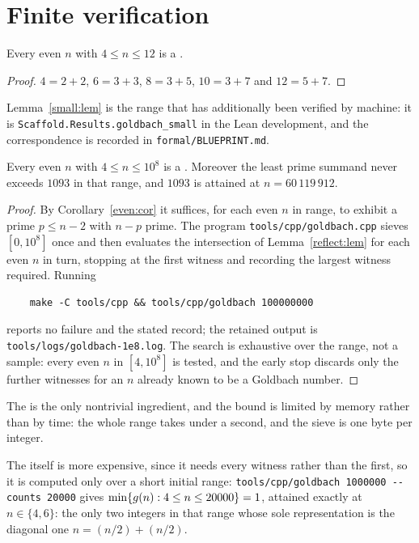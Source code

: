 \section{Finite verification}\label{sec:verify}

\begin{lemma}\label{small:lem}
Every even $n$ with $4\leq n\leq12$ is a .
\end{lemma}

\begin{proof}
$4=2+2$, $6=3+3$, $8=3+5$, $10=3+7$ and $12=5+7$.
\end{proof}

Lemma~\ref{small:lem} is the range that has additionally been verified by
machine: it is \texttt{Scaffold.Results.goldbach\_small} in the Lean
development, and the correspondence is recorded in
\texttt{formal/BLUEPRINT.md}.

\begin{theorem}\label{verify:thm}
Every even $n$ with $4\leq n\leq10^{8}$ is a .  Moreover
the least prime summand never exceeds $1093$ in that range, and $1093$ is
attained at $n=60\,119\,912$.
\end{theorem}

\begin{proof}
By Corollary~\ref{even:cor} it suffices, for each even $n$ in range, to exhibit
a prime $p\leq n-2$ with $n-p$ prime.  The program
\texttt{tools/cpp/goldbach.cpp} sieves $[0,10^{8}]$ once and then evaluates the
intersection of Lemma~\ref{reflect:lem} for each even $n$ in turn, stopping at
the first witness and recording the largest witness required.  Running
\begin{verbatim}
    make -C tools/cpp && tools/cpp/goldbach 100000000
\end{verbatim}
reports no failure and the stated record; the retained output is
\texttt{tools/logs/goldbach-1e8.log}.  The search is exhaustive over the range,
not a sample: every even $n$ in $[4,10^{8}]$ is tested, and the early stop
discards only the further witnesses for an $n$ already known to be a Goldbach
number.
\end{proof}

The  is the only nontrivial ingredient,
and the bound is limited by memory rather than by time: the whole range takes
under a second, and the sieve is one byte per integer.

The  itself is more expensive, since it needs every
witness rather than the first, so it is computed only over a short initial
range: \texttt{tools/cpp/goldbach 1000000 -{}-counts 20000} gives
$\min\{g(n):4\leq n\leq20000\}=1$, attained exactly at $n\in\{4,6\}$: the
only two integers in that range whose sole representation is the diagonal one
$n=(n/2)+(n/2)$.
